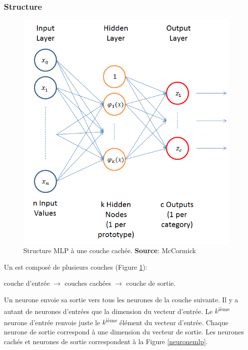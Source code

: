 {\subsubsection{Structure}
\begin{figure}
 \centering
 \includegraphics[scale=0.5]{../figures/nnstruct.png}
 \caption{Structure MLP à une couche cachée. \textbf{Source}: McCormick\cite{RBFtuto}}
 \label{structuremlp}
\end{figure}
Un \mlp est composé de plusieurs couches (Figure \ref{structuremlp}):
\begin{center}
 couche d'entrée $\rightarrow$ couches cachées $\rightarrow$ couche de sortie.
\end{center}
Un neurone envoie sa sortie vers tous les neurones de la couche suivante.
Il y a autant de neurones d'entrées que la dimension du vecteur d'entrée.
Le $k$\textsuperscript{ième} neurone d'entrée renvoie juste le $k$\textsuperscript{ième} élément du vecteur d'entrée.
Chaque neurone de sortie correspond à une dimension du vecteur de sortie.
Les neurones cachés et neurones de sortie correspondent à la Figure \ref{neuronemlp}.
}
